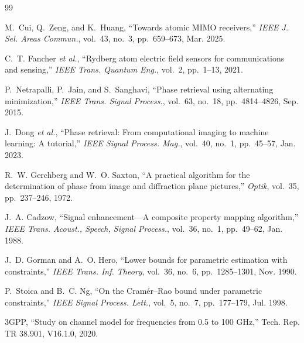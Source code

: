 \documentclass[conference]{IEEEtran}
\begin{document}
\begin{thebibliography}{99}
\scriptsize
\setlength{\itemsep}{0pt plus 0.3pt}

M.~Cui, Q.~Zeng, and K.~Huang, ``Towards atomic MIMO receivers,''
\emph{IEEE J. Sel. Areas Commun.}, vol.~43, no.~3, pp.~659--673, Mar. 2025.

C.~T. Fancher \emph{et al.}, ``Rydberg atom electric field sensors for
communications and sensing,'' \emph{IEEE Trans. Quantum Eng.}, vol.~2,
pp.~1--13, 2021.

P.~Netrapalli, P.~Jain, and S.~Sanghavi, ``Phase retrieval using alternating
minimization,'' \emph{IEEE Trans. Signal Process.}, vol.~63, no.~18,
pp.~4814--4826, Sep. 2015.

J.~Dong \emph{et al.}, ``Phase retrieval: From computational imaging to machine
learning: A tutorial,'' \emph{IEEE Signal Process. Mag.}, vol.~40, no.~1,
pp.~45--57, Jan. 2023.

R.~W. Gerchberg and W.~O. Saxton, ``A practical algorithm for the determination
of phase from image and diffraction plane pictures,'' \emph{Optik}, vol.~35,
pp.~237--246, 1972.

J.~A. Cadzow, ``Signal enhancement---A composite property mapping algorithm,''
\emph{IEEE Trans. Acoust., Speech, Signal Process.}, vol.~36, no.~1,
pp.~49--62, Jan. 1988.

J.~D. Gorman and A.~O. Hero, ``Lower bounds for parametric estimation with
constraints,'' \emph{IEEE Trans. Inf. Theory}, vol.~36, no.~6, pp.~1285--1301,
Nov. 1990.

P.~Stoica and B.~C. Ng, ``On the Cram\'er--Rao bound under parametric
constraints,'' \emph{IEEE Signal Process. Lett.}, vol.~5, no.~7, pp.~177--179,
Jul. 1998.

3GPP, ``Study on channel model for frequencies from 0.5 to 100 GHz,''
Tech. Rep. TR 38.901, V16.1.0, 2020.

\end{thebibliography}
\end{document}
